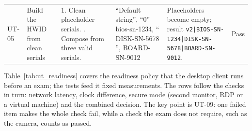{\begin{longtable}{@{}P{1.1cm}P{2.5cm}P{3.5cm}P{2.6cm}P{2.9cm}>{\centering\arraybackslash}p{1.8cm}@{}}
UT-05 & Build the HWID from clean serials & 1. Clean placeholder serials. . Compose from three valid serials. & ``Default string'', ``0'' \newline bios-sn-1234, `` DISK-SN-5678 '', BOARD-SN-9012  & Placeholders become empty; result \texttt{v2|\allowbreak{}BIOS-\allowbreak{}SN-\allowbreak{}1234|\allowbreak{}DISK-\allowbreak{}SN-\allowbreak{}5678|\allowbreak{}BOARD-\allowbreak{}SN-\allowbreak{}9012}. & Pass\\
\end{longtable}}

Table~\ref{tab:ut_readiness} covers the readiness policy that the desktop client runs before an exam; the tests feed it fixed measurements. The rows follow the checks in turn: network latency, clock difference, secure mode (second monitor, RDP or a virtual machine) and the combined decision. The key point is UT-09: one failed item makes the whole check fail, while a check the exam does not require, such as the camera, counts as passed.

